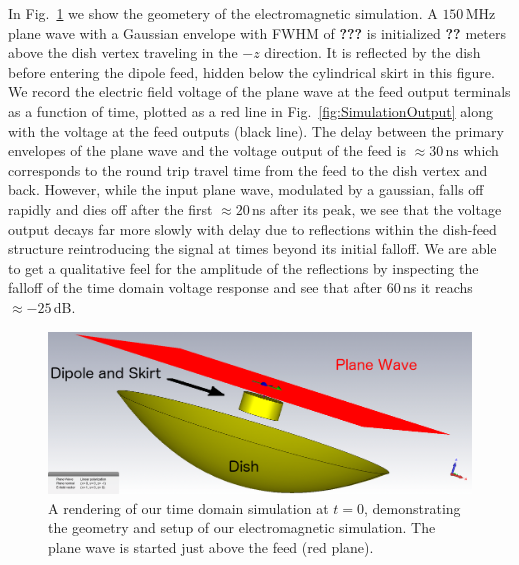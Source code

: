 \documentclass[twocolumn]{emulateapj}
\begin{document}
In Fig.~\ref{fig:SimulationSetup} we show the geometery of the electromagnetic simulation. A $150$\,MHz plane wave with a Gaussian envelope with FWHM of {\bf \color{red}???} is initialized {\bf \color{red} ??} meters above the dish vertex traveling in the $-z$ direction. It is reflected by the dish before entering the dipole feed, hidden below the cylindrical skirt in this figure. We record the electric field voltage of the plane wave at the feed output terminals as a function of time, plotted as a red line in Fig.~\ref{fig:SimulationOutput} along with the voltage at the feed outputs (black line). The delay between the primary envelopes of the plane wave and the voltage output of the feed is $\approx 30$\,ns which corresponds to the round trip travel time from the feed to the dish vertex and back. However, while the input plane wave, modulated by a gaussian, falls off rapidly and dies off after the first $\approx 20$\,ns after its peak, we see that the voltage output decays far more slowly with delay due to reflections within the dish-feed structure reintroducing the signal at times beyond its initial falloff. We are able to get a qualitative feel for the amplitude of the reflections by inspecting the falloff of the time domain voltage response and see that after $60$\,ns it reachs $\approx -25$\,dB.
\begin{figure}
\includegraphics[width=.5\textwidth]{figures/One_dish_Pfeed_render_pw_0deg.png}
\caption{A rendering of our time domain simulation at $t=0$, demonstrating the geometry and setup of our electromagnetic simulation. The plane wave is started just above the feed (red plane).}\label{fig:SimulationSetup}
\end{figure}
\end{document}
